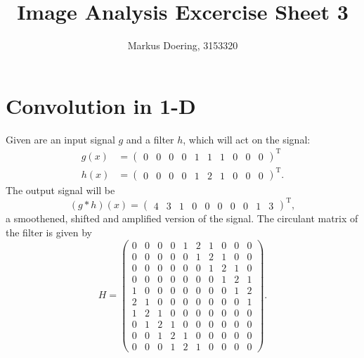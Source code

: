 \documentclass[11pt]{scrartcl}
\newcommand{\conv}{\ast}
\begin{document}
\title{Image Analysis Excercise Sheet 3}
\author{Markus Doering, 3153320}
\maketitle

\section{Convolution in 1-D}
Given are an input signal $g$ and a filter $h$, which will act on the signal: 
%
\begin{align*}
g(x) &= \begin{pmatrix}0  & 0  & 0  & 0  & 1  & 1  & 1  & 0  & 0  & 0 \end{pmatrix}^\mathrm T \\
h(x) &= \begin{pmatrix}0  & 0  & 0  & 0  & 1  & 2  & 1  & 0  & 0  & 0 \end{pmatrix}^\mathrm T. 
\end{align*}
%
The output signal will be 
%
\begin{equation*}
(g\conv h)(x) = \begin{pmatrix}4  & 3  & 1  & 0  & 0  & 0  & 0  & 0  & 1  & 3 \end{pmatrix}^\mathrm T,
\end{equation*}
%
a smoothened, shifted and amplified version of the signal. The circulant matrix of the filter is given by 
%
\begin{equation*}
H = %
 \begin{pmatrix}
  0  & 0  & 0  & 0  & 1  & 2  & 1  & 0  & 0  & 0  \\
  0  & 0  & 0  & 0  & 0  & 1  & 2  & 1  & 0  & 0  \\
  0  & 0  & 0  & 0  & 0  & 0  & 1  & 2  & 1  & 0  \\
  0  & 0  & 0  & 0  & 0  & 0  & 0  & 1  & 2  & 1  \\
  1  & 0  & 0  & 0  & 0  & 0  & 0  & 0  & 1  & 2  \\
  2  & 1  & 0  & 0  & 0  & 0  & 0  & 0  & 0  & 1  \\
  1  & 2  & 1  & 0  & 0  & 0  & 0  & 0  & 0  & 0  \\ 
  0  & 1  & 2  & 1  & 0  & 0  & 0  & 0  & 0  & 0  \\
  0  & 0  & 1  & 2  & 1  & 0  & 0  & 0  & 0  & 0  \\
  0  & 0  & 0  & 1  & 2  & 1  & 0  & 0  & 0  & 0
 \end{pmatrix}.
\end{equation*}
\end{document}

